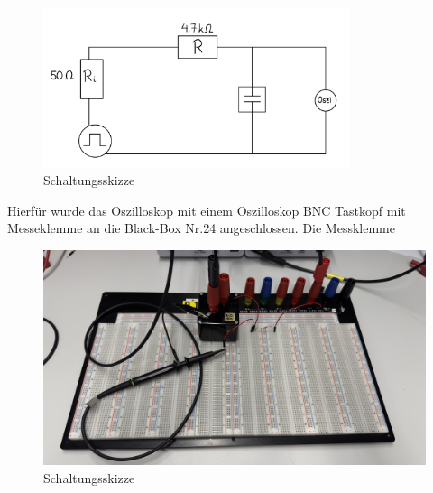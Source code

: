 \documentclass[a4paper,12pt]{article}
\begin{document}
\begin{figure}[H]
    \centering
    \includegraphics[width=0.8\textwidth]{../Quellen/Labor2/SchaltungsaufbauVersuch1.jpeg}
\caption{Schaltungsskizze}
\end{figure}

Hierfür wurde das Oszilloskop mit einem Oszilloskop BNC Tastkopf mit Messeklemme an die Black-Box Nr.24 angeschlossen. Die Messklemme

\begin{figure}[H]
    \centering
    \includegraphics[width=1.0\textwidth]{../Quellen/Labor2/Fotos/IMG_3965.jpeg}
\caption{Schaltungsskizze}
\end{figure}
\end{document}
